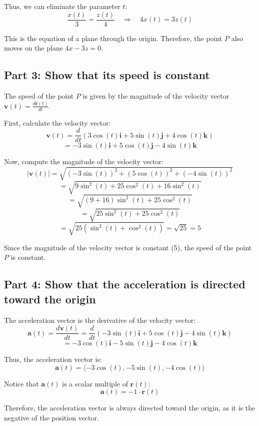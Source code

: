 \documentclass[11pt]{article}
\begin{document}
Thus, we can eliminate the parameter \( t \):
\[
\frac{x(t)}{3} = \frac{z(t)}{4} \quad \Rightarrow \quad 4x(t) = 3z(t)
\]

This is the equation of a plane through the origin. Therefore, the point \( P \) also moves on the plane \( 4x - 3z = 0 \).

\newpage

\subsection{Part 3: Show that its speed is constant}

The speed of the point \( P \) is given by the magnitude of the velocity vector \( \mathbf{v}(t) = \frac{d\mathbf{r}(t)}{dt} \).

First, calculate the velocity vector:
\[
\mathbf{v}(t) = \frac{d}{dt} \left( 3 \cos(t) \mathbf{i} + 5 \sin(t) \mathbf{j} + 4 \cos(t) \mathbf{k} \right)
\]
\[
= -3 \sin(t) \mathbf{i} + 5 \cos(t) \mathbf{j} - 4 \sin(t) \mathbf{k}
\]

Now, compute the magnitude of the velocity vector:
\[
|\mathbf{v}(t)| = \sqrt{(-3 \sin(t))^2 + (5 \cos(t))^2 + (-4 \sin(t))^2}
\]
\[
= \sqrt{9 \sin^2(t) + 25 \cos^2(t) + 16 \sin^2(t)}
\]
\[
= \sqrt{(9 + 16) \sin^2(t) + 25 \cos^2(t)}
\]
\[
= \sqrt{25 \sin^2(t) + 25 \cos^2(t)}
\]
\[
= \sqrt{25 (\sin^2(t) + \cos^2(t))} = \sqrt{25} = 5
\]

Since the magnitude of the velocity vector is constant (5), the speed of the point \( P \) is constant.

\newpage

\subsection{Part 4: Show that the acceleration is directed toward the origin}

The acceleration vector is the derivative of the velocity vector:
\[
\mathbf{a}(t) = \frac{d\mathbf{v}(t)}{dt} = \frac{d}{dt} \left( -3 \sin(t) \mathbf{i} + 5 \cos(t) \mathbf{j} - 4 \sin(t) \mathbf{k} \right)
\]
\[
= -3 \cos(t) \mathbf{i} - 5 \sin(t) \mathbf{j} - 4 \cos(t) \mathbf{k}
\]

Thus, the acceleration vector is:
\[
\mathbf{a}(t) = \langle -3 \cos(t), -5 \sin(t), -4 \cos(t) \rangle
\]

Notice that \( \mathbf{a}(t) \) is a scalar multiple of \( \mathbf{r}(t) \):
\[
\mathbf{a}(t) = -1 \cdot \mathbf{r}(t)
\]

Therefore, the acceleration vector is always directed toward the origin, as it is the negative of the position vector.
\end{document}
